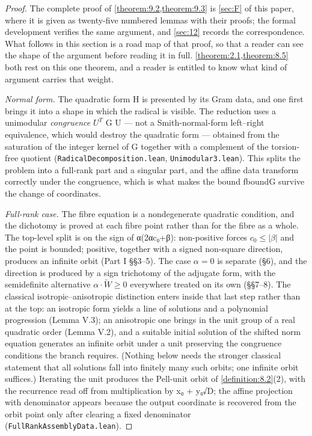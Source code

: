 \documentclass[11pt]{article}
\theoremstyle{plain}
\theoremstyle{definition}
\theoremstyle{remark}
\theoremstyle{plain}
\theoremstyle{definition}
\theoremstyle{remark}
\newcounter{Part}
\theoremstyle{plain}
\theoremstyle{definition}
\theoremstyle{remark}
\begin{document}
\begin{proof}
The complete proof of \cref{theorem:9.2,theorem:9.3} is \cref{sec:F} of this paper, where it is given as twenty-five numbered lemmas with their proofs; the formal development verifies the same argument, and \cref{sec:12} records the correspondence. What follows in this section is a road map of that proof, so that a reader can see the shape of the argument before reading it in full. \cref{theorem:2.1,theorem:8.5} both rest on this one theorem, and a reader is entitled to know what kind of argument carries that weight.

\emph{Normal form.} The quadratic form H is presented by its Gram data, and one first brings it into a shape in which the radical is visible. The reduction uses a unimodular \emph{congruence} $U^{T}$ G U — not a Smith-normal-form left–right equivalence, which would destroy the quadratic form — obtained from the saturation of the integer kernel of G together with a complement of the torsion-free quotient (\texttt{RadicalDecomposition.\allowbreak{}lean}, \texttt{Unimodular3.\allowbreak{}lean}). This splits the problem into a full-rank part and a singular part, and the affine data transform correctly under the congruence, which is what makes the bound fboundG survive the change of coordinates.

\emph{Full-rank case.} The fibre equation is a nondegenerate quadratic condition, and the dichotomy is proved at each fibre point rather than for the fibre as a whole. The top-level split is on the sign of α(2αc₀+β): non-positive forces $c_{0} ≤ |β|$ and the point is bounded; positive, together with a signed non-square direction, produces an infinite orbit (Part I §§3–5). The case $α = 0$ is separate (§6), and the direction is produced by a sign trichotomy of the adjugate form, with the semidefinite alternative $α·\tilde{W} ≥ 0$ everywhere treated on its own (§§7–8). The classical isotropic–anisotropic distinction enters inside that last step rather than at the top: an isotropic form yields a line of solutions and a polynomial progression (Lemma V.3); an anisotropic one brings in the unit group of a real quadratic order (Lemma V.2), and a suitable initial solution of the shifted norm equation generates an infinite orbit under a unit preserving the congruence conditions the branch requires. (Nothing below needs the stronger classical statement that all solutions fall into finitely many such orbits; one infinite orbit suffices.) Iterating the unit produces the Pell-unit orbit of \cref{definition:8.2}(2), with the recurrence read off from multiplication by x₀ + y₀√D; the affine projection with denominator appears because the output coordinate is recovered from the orbit point only after clearing a fixed denominator (\texttt{FullRankAssemblyData.\allowbreak{}lean}).


\end{proof}
\end{document}
